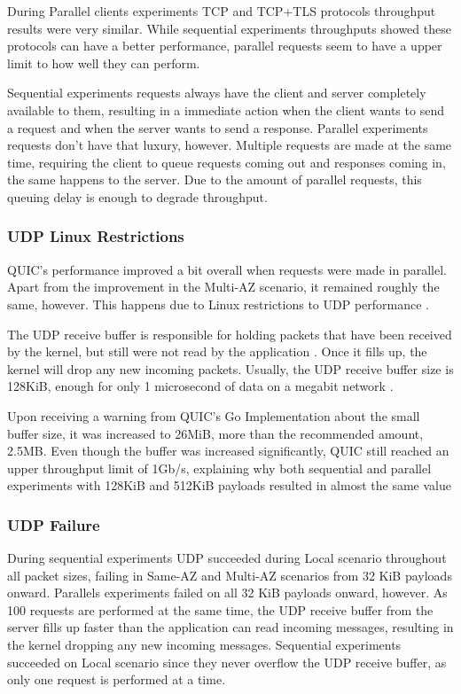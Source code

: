During Parallel clients experiments TCP and TCP+TLS protocols throughput results were very similar. While sequential experiments throughputs showed these protocols can have a better performance, parallel requests seem to have a upper limit to how well they can perform.

Sequential experiments requests always have the client and server completely available to them, resulting in a immediate action when the client wants to send a request and when the server wants to send a response. Parallel experiments requests don't have that luxury, however. Multiple requests are made at the same time, requiring the client to queue requests coming out and responses coming in, the same happens to the server. Due to the amount of parallel requests, this queuing delay is enough to degrade throughput.

\subsubsection*{UDP Linux Restrictions}

QUIC's performance improved a bit overall when requests were made in parallel. Apart from the improvement in the Multi-AZ scenario, it remained roughly the same, however. This happens due to Linux restrictions to UDP performance \cite{linux_tuning}. 

The UDP receive buffer is responsible for holding packets that have been received by the kernel, but still were not read by the application \cite{udp_buffer_size_warning}. Once it fills up, the kernel will drop any new incoming packets. Usually, the UDP receive buffer size is 128KiB, enough for only 1 microsecond of data on a megabit network \cite{linux_tuning}.

Upon receiving a warning from QUIC's Go Implementation about the small buffer size, it was increased to 26MiB, more than the recommended amount, 2.5MB. Even though the buffer was increased significantly, QUIC still reached an upper throughput limit of 1Gb/s, explaining why both sequential and parallel experiments with 128KiB and 512KiB payloads resulted in almost the same value

\subsubsection*{UDP Failure}

During sequential experiments UDP succeeded during Local scenario throughout all packet sizes, failing in Same-AZ and Multi-AZ scenarios from 32 KiB payloads onward. Parallels experiments failed on all 32 KiB payloads onward, however. As 100 requests are performed at the same time, the UDP receive buffer from the server fills up faster than the application can read incoming messages, resulting in the kernel dropping any new incoming messages. Sequential experiments succeeded on Local scenario since they never overflow the UDP receive buffer, as only one request is performed at a time.

